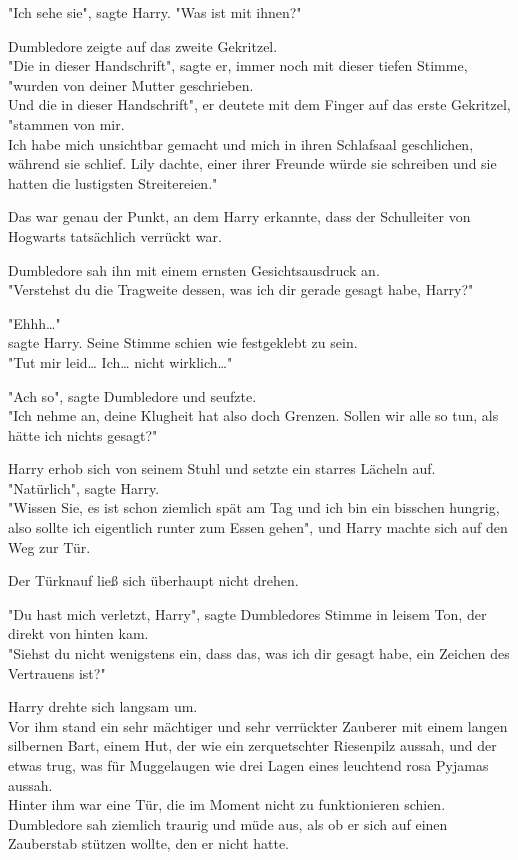 {"Ich sehe sie", sagte Harry. "Was ist mit ihnen?"

Dumbledore zeigte auf das zweite Gekritzel.\\ "Die in dieser Handschrift", sagte er, immer noch mit dieser tiefen Stimme,\\ "wurden von deiner Mutter geschrieben.\\ Und die in dieser Handschrift", er deutete mit dem Finger auf das erste Gekritzel,\\ "stammen von mir.\\ Ich habe mich unsichtbar gemacht und mich in ihren Schlafsaal geschlichen, während sie schlief. Lily dachte, einer ihrer Freunde würde sie schreiben und sie hatten die lustigsten Streitereien."

Das war genau der Punkt, an dem Harry erkannte, dass der Schulleiter von Hogwarts tatsächlich verrückt war.

Dumbledore sah ihn mit einem ernsten Gesichtsausdruck an.\\ "Verstehst du die Tragweite dessen, was ich dir gerade gesagt habe, Harry?"

"Ehhh…"\\ sagte Harry. Seine Stimme schien wie festgeklebt zu sein.\\ "Tut mir leid… Ich… nicht wirklich…"

"Ach so", sagte Dumbledore und seufzte.\\ "Ich nehme an, deine Klugheit hat also doch Grenzen. Sollen wir alle so tun, als hätte ich nichts gesagt?"

Harry erhob sich von seinem Stuhl und setzte ein starres Lächeln auf.\\ "Natürlich", sagte Harry.\\ "Wissen Sie, es ist schon ziemlich spät am Tag und ich bin ein bisschen hungrig, also sollte ich eigentlich runter zum Essen gehen", und Harry machte sich auf den Weg zur Tür.

Der Türknauf ließ sich überhaupt nicht drehen.

"Du hast mich verletzt, Harry", sagte Dumbledores Stimme in leisem Ton, der direkt von hinten kam.\\ "Siehst du nicht wenigstens ein, dass das, was ich dir gesagt habe, ein Zeichen des Vertrauens ist?"

Harry drehte sich langsam um.\\ Vor ihm stand ein sehr mächtiger und sehr verrückter Zauberer mit einem langen silbernen Bart, einem Hut, der wie ein zerquetschter Riesenpilz aussah, und der etwas trug, was für Muggelaugen wie drei Lagen eines leuchtend rosa Pyjamas aussah.\\ Hinter ihm war eine Tür, die im Moment nicht zu funktionieren schien. Dumbledore sah ziemlich traurig und müde aus, als ob er sich auf einen Zauberstab stützen wollte, den er nicht hatte.

}
